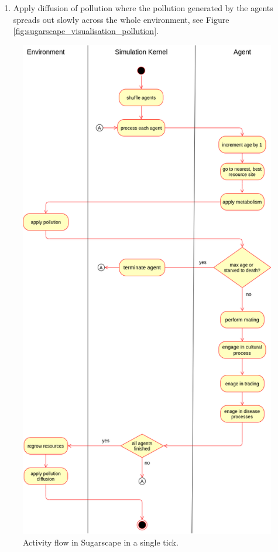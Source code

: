 \begin{enumerate}
\begin{enumerate}
			\item Apply diffusion of pollution where the pollution generated by the agents spreads out slowly across the whole environment, see Figure \ref{fig:sugarscape_visualisation_pollution}.
		\end{enumerate}
\end{enumerate}

\begin{figure}
	\centering
	\includegraphics[width=.9\textwidth, angle=0]{./fig/background/abs/sugarscape_activity.png}
	\caption[Activity flow in Sugarscape]{Activity flow in Sugarscape in a single tick.}
	\label{fig:sugarscape_activities}
\end{figure}


